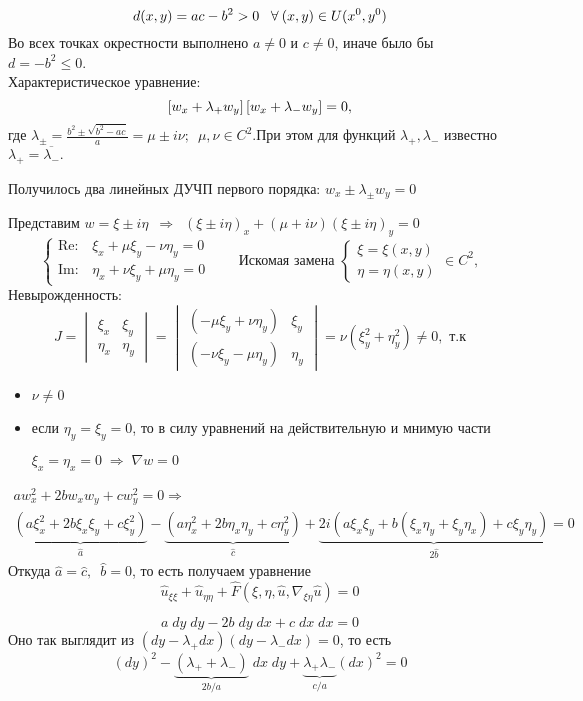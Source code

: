 \documentclass[../main.tex]{subfiles}
\begin{document}
$$
d(x, y) = ac - b^2 > 0 \;\;\;\forall\: (x, y) \in U(x^0, y^0)
$$
Во всех точках окрестности выполнено $a\ne 0$ и $c\ne 0$, иначе было бы $d = -b^2 \leq 0$.\\ 
Характеристическое уравнение:
$$
\left[w_x + \lambda_+w_y\right]\left[w_x + \lambda_-w_y\right] = 0,
$$
где $\lambda_\pm = \frac{b^2\pm\sqrt{b^2 - ac}}{a} = \mu \pm i\nu; \;\ \mu, \nu \in C^2$.\quad При этом для функций $\lambda_+, \lambda_-$ известно $\lambda_+ = \overline{\lambda_-}.$
\vspace{0.3em}

Получилось два линейных ДУЧП первого порядка: \quad $w_x \pm \lambda_\pm w_y = 0 $

Представим $w = \xi \pm i\eta \;\ \Rightarrow\;\ 
(\xi \pm i\eta)_x + (\mu + i\nu)(\xi \pm i\eta)_y = 0$
$$
\begin{cases}
    \mathrm{Re:} & \xi_x + \mu\xi_y - \nu\eta_y = 0\\
    \mathrm{Im:} & \eta_x + \nu\xi_y + \mu\eta_y = 0
\end{cases}\qquad \text{Искомая замена }
\begin{cases}
    \xi = \xi(x, y) \\
    \eta = \eta(x, y)
\end{cases} \in C^2,
$$
Невырожденность:
$$ J = 
\begin{vmatrix}
    \xi_x & \xi_y \\
    \eta_x & \eta_y
\end{vmatrix} =
\begin{vmatrix}
    (-\mu\xi_y + \nu\eta_y) & \xi_y \\
    (-\nu\xi_y - \mu\eta_y) & \eta_y
\end{vmatrix} =
\nu (\xi_y^2 + \eta_y^2) \neq 0, \text{ т.к} $$
\begin{itemize}[nolistsep]
    \item $\nu \neq 0$
    \item если $\eta_y = \xi_y = 0$, то в силу уравнений на действительную и мнимую части
    
    $\xi_x = \eta_x = 0 \; \Rightarrow \; \nabla w = 0$
\end{itemize}
\begin{multline*}
a w_x^2 + 2bw_x w_y + c w_y^2 = 0 \Rightarrow \\
\underbrace{(a\xi^2_x + 2b\xi_x\xi_y + c\xi_y^2)}_{\hat a} -
\underbrace{(a\eta_x^2 + 2b\eta_x\eta_y + c\eta_y^2)}_{\hat c}+ 
\underbrace{2i(a\xi_x\xi_y + b(\xi_x\eta_y + \xi_y\eta_x) + c\xi_y\eta_y)}_{2\hat b} = 0
\end{multline*}
Откуда $\hat a = \hat c,\;\ \hat b = 0$, то есть получаем уравнение
$$
\hat u_{\xi\xi} + \hat u_{\eta\eta} + \hat F(\xi, \eta, \hat u, \nabla_{\xi\eta}\hat u) = 0
$$

$$
a\;dy\;dy - 2b\;dy\;dx + c\;dx\;dx =0
$$
Оно так выглядит из $(dy - \lambda_+dx)(dy - \lambda_-dx)=0$, то есть 
$$
(dy)^2 - \underbrace{(\lambda_+ + \lambda_-)}_{2b/a}\;dx\;dy + \underbrace{\lambda_+\lambda_-}_{c/a}(dx)^2 = 0
$$
\end{document}
